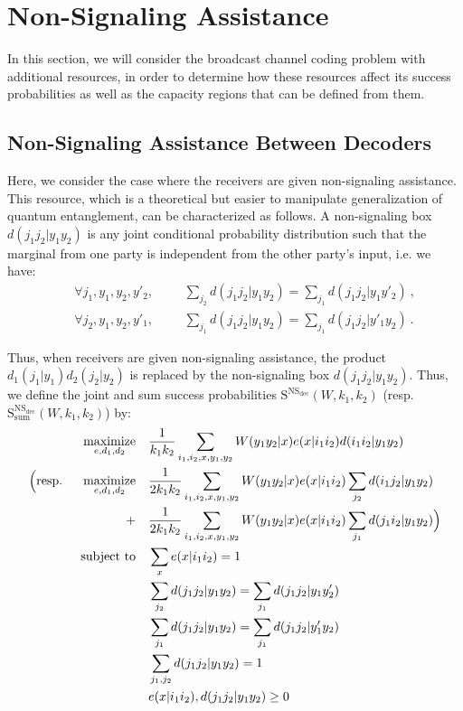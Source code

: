 \section{Non-Signaling Assistance}
\label{section:NSBC}
In this section, we will consider the broadcast channel coding problem with additional resources, in order to determine how these resources affect its success probabilities as well as the capacity regions that can be defined from them.

\subsection{Non-Signaling Assistance Between Decoders}
Here, we consider the case where the receivers are given non-signaling assistance. This resource, which is a theoretical but easier to manipulate generalization of quantum entanglement, can be characterized as follows.  A non-signaling box $d(j_1j_2|y_1y_2)$ is any joint conditional probability distribution such that the marginal from one party is independent from the other party's input, i.e. we have:
\begin{equation}
  \begin{aligned}
    &&\forall j_1,y_1,y_2,y'_2, &&&\sum_{j_2} d(j_1j_2|y_1y_2) = \sum_{j_1} d(j_1j_2|y_1y'_2) \ ,\\
    &&\forall j_2,y_1,y_2,y'_1, &&&\sum_{j_1} d(j_1j_2|y_1y_2) = \sum_{j_1} d(j_1j_2|y'_1y_2) \ .
  \end{aligned}
\end{equation}

Thus, when receivers are given non-signaling assistance, the product $d_1(j_1|y_1)d_2(j_2|y_2)$ is replaced by the non-signaling box $d(j_1j_2|y_1y_2)$. Thus, we define the joint and sum success probabilities $\mathrm{S}^{\mathrm{NS}_{\text{dec}}}(W,k_1,k_2)$ (resp. $\mathrm{S}_{\text{sum}}^{\mathrm{NS}_{\text{dec}}}(W,k_1,k_2)$) by:
\begin{equation}
  \begin{aligned}
    &&\underset{e,d_1,d_2}{\operatorname{\text{maximize}}} &&& \frac{1}{k_1k_2}\sum_{i_1,i_2,x,y_1,y_2} W(y_1y_2|x)e(x|i_1i_2)d(i_1i_2|y_1y_2)\\
    \Big(\text{resp. }&&\underset{e,d_1,d_2}{\operatorname{\text{maximize}}} &&& \frac{1}{2k_1k_2}\sum_{i_1,i_2,x,y_1,y_2} W(y_1y_2|x)e(x|i_1i_2)\sum_{j_2}d(i_1j_2|y_1y_2)\\
    &&+&&& \frac{1}{2k_1k_2}\sum_{i_1,i_2,x,y_1,y_2} W(y_1y_2|x)e(x|i_1i_2)\sum_{j_1}d(j_1i_2|y_1y_2)\Big)\\
    &&\operatorname{\text{subject to}} &&& \sum_x e(x|i_1i_2) = 1\\
    &&&&& \sum_{j_2} d(j_1j_2|y_1y_2) = \sum_{j_1} d(j_1j_2|y_1y'_2)\\
    &&&&& \sum_{j_1} d(j_1j_2|y_1y_2) = \sum_{j_1} d(j_1j_2|y'_1y_2)\\
    &&&&& \sum_{j_1,j_2} d(j_1j_2|y_1y_2) = 1\\
    &&&&& e(x|i_1i_2), d(j_1j_2|y_1y_2) \geq 0\\
  \end{aligned}
\end{equation}

